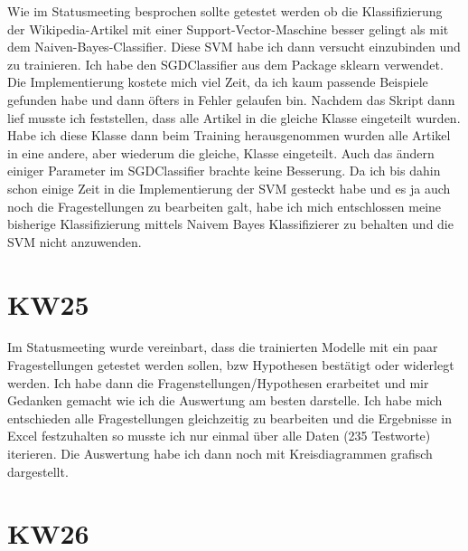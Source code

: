 \documentclass[11pt,a4paper]{article}
\begin{document}
Wie im Statusmeeting besprochen sollte getestet werden ob die Klassifizierung der Wikipedia-Artikel mit einer Support-Vector-Maschine besser gelingt als mit dem Naiven-Bayes-Classifier. Diese SVM habe ich dann versucht einzubinden und zu trainieren. Ich habe den SGDClassifier aus dem Package sklearn verwendet. Die Implementierung kostete mich viel Zeit, da ich kaum passende Beispiele gefunden habe und dann öfters in Fehler gelaufen bin. Nachdem das Skript dann lief musste ich feststellen, dass alle Artikel in die gleiche Klasse eingeteilt wurden. Habe ich diese Klasse dann beim Training herausgenommen wurden alle Artikel in eine andere, aber wiederum die gleiche, Klasse eingeteilt. Auch das ändern einiger Parameter im SGDClassifier brachte keine Besserung. Da ich bis dahin schon einige Zeit in die Implementierung der SVM gesteckt habe und es ja auch noch die Fragestellungen zu bearbeiten galt, habe ich mich entschlossen meine bisherige Klassifizierung mittels Naivem Bayes Klassifizierer zu behalten und die SVM nicht anzuwenden.\\


\section*{KW25}
Im Statusmeeting wurde vereinbart, dass die trainierten Modelle mit ein paar Fragestellungen getestet werden sollen, bzw Hypothesen bestätigt oder widerlegt werden. Ich habe dann die Fragenstellungen/Hypothesen erarbeitet und mir Gedanken gemacht wie ich die Auswertung am besten darstelle. Ich habe mich entschieden alle Fragestellungen gleichzeitig zu bearbeiten und die Ergebnisse in Excel festzuhalten so musste ich nur einmal über alle Daten (235 Testworte) iterieren. Die Auswertung habe ich dann noch mit Kreisdiagrammen grafisch dargestellt.

\section*{KW26}
\end{document}
